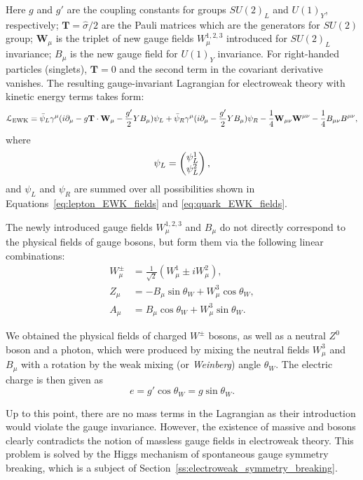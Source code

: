 Here $g$ and $g'$ are the coupling constants for groups $SU(2)_L$ and $U(1)_Y$, respectively; $\mathbf{T} =
\hat{\sigma}/2$ are the Pauli matrices which are the generators for $SU(2)$ group; $\mathbf{W}_\mu$ is the triplet of
new gauge fields $W^{1,2,3}_\mu$ introduced for $SU(2)_L$ invariance; $B_\mu$ is the new gauge field for $U(1)_Y$
invariance. For right-handed particles (singlets), $\mathbf{T} = 0$ and the second term in the covariant derivative
vanishes. The resulting gauge-invariant Lagrangian for electroweak theory with kinetic energy terms takes form:
\begin{equation}
\label{eq:EWK_L}
\mathcal{L}_\textrm{EWK} = \bar{\psi}_L \gamma^\mu ( i\partial_\mu  - g \mathbf{T} \cdot \mathbf{W}_\mu - \frac{g'}{2} Y
B_\mu) \psi_L + \bar{\psi}_R \gamma^\mu (i \partial_\mu - \frac{g'}{2} Y B_\mu) \psi_R - \frac{1}{4}\mathbf{W}_{\mu\nu}
\mathbf{W}^{\mu\nu} -\frac{1}{4}B_{\mu\nu} B^{\mu\nu},
\end{equation}
where
\begin{equation*}
\psi_L = \begin{pmatrix} \psi^1_L \\ \psi^2_L \end{pmatrix},
\end{equation*}
and $\psi_L$ and $\psi_R$ are summed over all possibilities shown in Equations~\ref{eq:lepton_EWK_fields} and
\ref{eq:quark_EWK_fields}.

The newly introduced gauge fields $W^{1,2,3}_\mu$ and $B_\mu$ do not directly correspond to the physical fields of
gauge bosons, but form them via the following linear combinations:
\begin{subequations}
\begin{align}
W^{\pm}_\mu & = \frac{1}{\sqrt{2}} (W^1_\mu \pm  i W^2_\mu), \label{eq:W_mu} \\
Z_\mu & = - B_\mu \sin{\theta_W} + W^3_\mu \cos{\theta_W}, \label{eq:Z_mu} \\
A_\mu & = B_\mu \cos{\theta_W} + W^3_\mu \sin{\theta_W}. \label{eq:A_mu}
\end{align}
\end{subequations}

We obtained the physical fields of charged $W^{\pm}$ bosons, as well as a neutral $Z^0$ boson and a photon, which were
produced by mixing the neutral fields $W^3_\mu$ and $B_\mu$ with a rotation by the weak mixing (or
\textit{Weinberg}) angle $\theta_W$. The electric charge is then given as
\begin{equation}
e = g' \cos{\theta_W} = g \sin{\theta_W}.
\end{equation}

Up to this point, there are no mass terms in the Lagrangian as their introduction would violate the gauge invariance.
However, the existence of massive \W and \Z bosons clearly contradicts the notion of massless gauge fields in
electroweak theory. This problem is solved by the Higgs mechanism of spontaneous gauge symmetry breaking, which is a
subject of Section~\ref{ss:electroweak_symmetry_breaking}.

